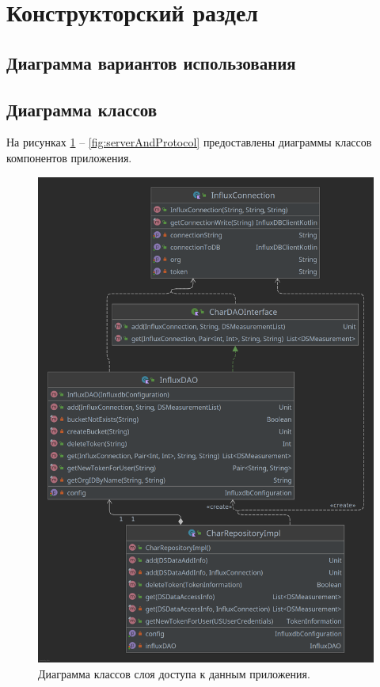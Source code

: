 \section{Конструкторский раздел}

\subsection{Диаграмма вариантов использования}

\subsection{Диаграмма классов}
На рисунках \ref{fig:dataLayer} -- \ref{fig:serverAndProtocol} предоставлены диаграммы классов компонентов приложения.

\begin{figure}[H]
\begin{center}
\includegraphics[width=\textwidth]{img/dataLayerDiagram.png}
\captionsetup{justification=centering}
	\caption{Диаграмма классов слоя доступа к данным приложения. }
	\label{fig:dataLayer}
\end{center}
\end{figure}

